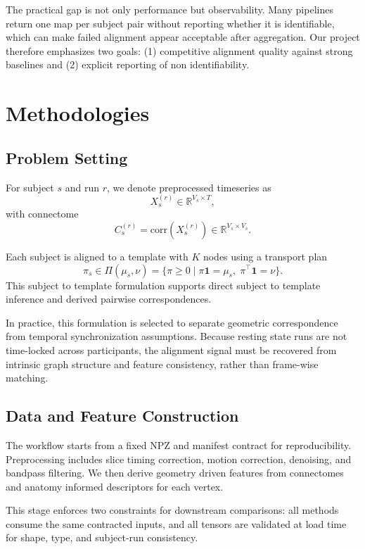 \documentclass[conference]{IEEEtran}
\begin{document}
The practical gap is not only performance but observability. Many pipelines return one map per subject pair without reporting whether it is identifiable, which can make failed alignment appear acceptable after aggregation. Our project therefore emphasizes two goals: (1) competitive alignment quality against strong baselines and (2) explicit reporting of non identifiability.

\section{Methodologies}
\subsection{Problem Setting}
For subject $s$ and run $r$, we denote preprocessed timeseries as
\begin{equation}
X_s^{(r)} \in \mathbb{R}^{V_s \times T},
\end{equation}
with connectome
\begin{equation}
C_s^{(r)} = \mathrm{corr}(X_s^{(r)}) \in \mathbb{R}^{V_s \times V_s}.
\end{equation}

Each subject is aligned to a template with $K$ nodes using a transport plan
\begin{equation}
\pi_s \in \Pi(\mu_s,\nu)=\{\pi\ge 0 \mid \pi\mathbf{1}=\mu_s,\;\pi^\top\mathbf{1}=\nu\}.
\end{equation}
This subject to template formulation supports direct subject to template inference and derived pairwise correspondences.

In practice, this formulation is selected to separate geometric correspondence from temporal synchronization assumptions. Because resting state runs are not time-locked across participants, the alignment signal must be recovered from intrinsic graph structure and feature consistency, rather than frame-wise matching.

\subsection{Data and Feature Construction}
The workflow starts from a fixed NPZ and manifest contract for reproducibility. Preprocessing includes slice timing correction, motion correction, denoising, and bandpass filtering. We then derive geometry driven features from connectomes and anatomy informed descriptors for each vertex.

This stage enforces two constraints for downstream comparisons: all methods consume the same contracted inputs, and all tensors are validated at load time for shape, type, and subject-run consistency.
\end{document}
